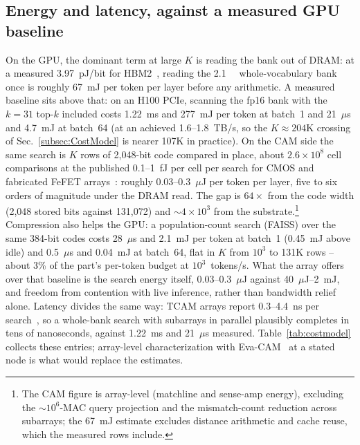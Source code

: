 \documentclass[conference]{IEEEtran}
\newcommand{\cam}{{CAM}\xspace}
\newcommand{\tcam}{{TCAM}\xspace}
\newcommand{\fefet}{{FeFET}\xspace}
\begin{document}
\subsection{Energy and latency, against a measured GPU baseline}
\label{subsec:CostModelGap}
\label{subsec:NextMeasurements}
On the GPU, the dominant term at large $K$ is reading the bank out of
DRAM: at a measured 3.97~pJ/bit for HBM2~\cite{oconnor2017fgdram},
reading the \qty{2.1}{\giga\byte} whole-vocabulary bank once is
roughly 67~mJ per token per layer before any arithmetic. A measured
baseline sits above that: on an H100 PCIe, scanning the fp16 bank
with the $k=31$ top-$k$ included costs 1.22~ms and 277~mJ per token
at batch~1 and 21~$\mu$s and 4.7~mJ at batch~64 (at an achieved
1.6--1.8~TB/s, so the $K\!\approx\!204$K crossing of
Sec.~\ref{subsec:CostModel} is nearer 107K in practice). On the \cam
side the same search is $K$ rows of 2{,}048-bit code compared in
place, about $2.6\!\times\!10^{8}$ cell comparisons at the published
0.1--1~fJ per cell per search for CMOS and fabricated \fefet
arrays~\cite{pagiamtzis2006cam,ni2019fetcam,liu2022evacam}: roughly
0.03--0.3~$\mu$J per token per layer, five to six orders of magnitude
under the DRAM read. The gap is $64\times$ from the code width
(2{,}048 stored bits against 131{,}072) and
$\sim$$4\!\times\!10^{3}$ from the substrate.\footnote{The \cam figure is array-level (matchline and
sense-amp energy), excluding the $\sim$$10^{6}$-MAC query projection
and the mismatch-count reduction across subarrays; the 67~mJ
estimate excludes distance arithmetic and cache reuse, which the
measured rows include.} Compression also helps the GPU: a
population-count search (FAISS) over the
same 384-bit codes costs 28~$\mu$s and 2.1~mJ per token at batch~1
(0.45~mJ above idle) and 0.5~$\mu$s and 0.04~mJ at batch~64, flat in
$K$ from $10^{3}$ to 131K rows -- about 3\% of the part's per-token
budget at $10^{3}$~tokens/s. What the array offers over that
baseline is the search energy itself, 0.03--0.3~$\mu$J against
40~$\mu$J--2~mJ, and freedom from contention with live inference,
rather than bandwidth relief alone. Latency divides the same way:
\tcam arrays report 0.3--4.4~ns per
search~\cite{liu2022evacam,ni2019fetcam}, so a whole-bank search with
subarrays in parallel plausibly completes in tens of nanoseconds,
against 1.22~ms and 21~$\mu$s measured. Table~\ref{tab:costmodel}
collects these entries; array-level characterization with
Eva-CAM~\cite{liu2022evacam} at a stated node is what would replace
the estimates.
\end{document}
